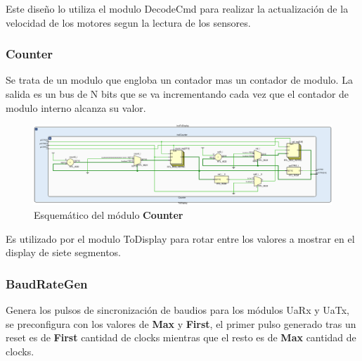 \documentclass[12pt]{article}
\begin{document}
Este diseño lo utiliza el modulo DecodeCmd para realizar la actualización de la velocidad de los motores segun la lectura de los sensores.

\subsubsection{Counter}
Se trata de un modulo que engloba un contador mas un contador de modulo.
La salida es un bus de N bits que se va incrementando cada vez que el contador de modulo interno alcanza su valor.
\begin{figure}[H]
    \centering
    \includegraphics[width=\textwidth]{counter-crop}
    \caption{Esquemático del módulo \textbf{Counter}}
\end{figure}

Es utilizado por el modulo ToDisplay para rotar entre los valores a mostrar en el display de siete segmentos.

\subsubsection{BaudRateGen}
Genera los pulsos de sincronización de baudios para los módulos UaRx y UaTx, se preconfigura con los valores de \textbf{Max} y \textbf{First}, el primer pulso generado tras un reset es de \textbf{First} cantidad de clocks mientras que el resto es de \textbf{Max} cantidad de clocks.
\end{document}
